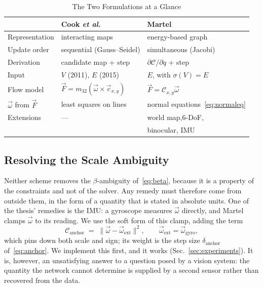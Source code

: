 \documentclass[journal]{IEEEtran}
\newcommand{\Vmap}{V}
\newcommand{\Fmap}{\vec{F}}
\newcommand{\Cmat}{\mathcal{C}}
\newcommand{\wvec}{\vec{\omega}}
\begin{document}
\begin{table}[!t]
\renewcommand{\arraystretch}{1.25}
\caption{The Two Formulations at a Glance}
\label{tab:variants}
\centering
\footnotesize
\begin{tabular}{@{}lll@{}}
\toprule
 & \textbf{Cook \emph{et al.}}~\cite{cook2011,martel2015relational} & \textbf{Martel}~\cite{martel2019thesis} \\
\midrule
Representation      & interacting maps          & energy-based graph \\
Update order & sequential (Gauss--Seidel)& simultaneous (Jacobi) \\
Derivation   & candidate map + step      & $\partial\mathcal{C}/\partial q$ + step \\
Input        & $\Vmap$ (2011), $E$ (2015)   & $E$, with $\sigma(\Vmap)=E$  \\
Flow model   & $\Fmap = m_{32}(\wvec\times \vec c_{x,y})$ & $\Fmap = \Cmat_{x,y}\wvec$ \\
$\wvec$ from $\Fmap$ & least squares on lines & normal equations~\eqref{eq:normaleq} \\
Extensions   & --- & world map,6-DoF,\\ & & binocular, IMU \\
\bottomrule
\end{tabular}
\end{table}

\subsection{Resolving the Scale Ambiguity}
\label{sec:scale}

Neither scheme removes the $\beta$-ambiguity of~\eqref{eq:beta}, because it is a
property of the constraints and not of the solver. Any remedy must therefore come
from outside them, in the form of a quantity that is stated in absolute units.
One of the thesis' remedies is the IMU: a gyroscope measures $\wvec$ directly,
and Martel clamps $\wvec$ to its reading. We use the soft form of this clamp,
adding the term
\begin{equation}
\mathcal{C}_{\text{anchor}} \;=\; \|\wvec - \wvec_{\text{ext}}\|^2,
\qquad \wvec_{\text{ext}} = \wvec_{\text{gyro}},
\label{eq:anchorcost}
\end{equation}
which pins down both scale and sign; its weight is the step size
$\delta_{\text{anchor}}$ of~\eqref{eq:anchor}. We implement this first, and it works
(Sec.~\ref{sec:experiments}). It is, however, an unsatisfying answer to a
question posed by a vision system: the quantity the network cannot determine is
supplied by a second sensor rather than recovered from the data.
\end{document}
